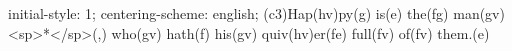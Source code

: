 initial-style: 1;
centering-scheme: english;
(c3)Hap(hv)py(g) is(e) the(fg) man(gv) <sp>*</sp>(,) who(gv) hath(f) his(gv) quiv(hv)er(fe) full(fv) of(fv) them.(e)

